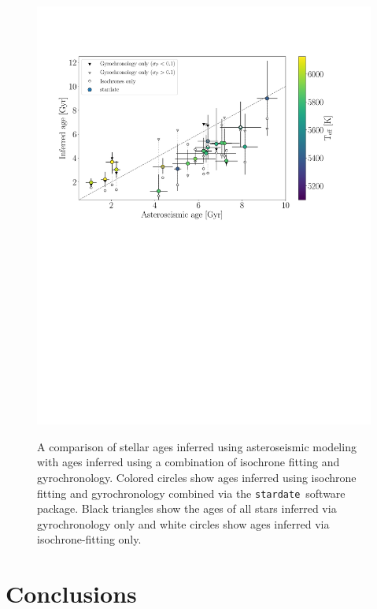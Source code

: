 \documentclass[useAMS, usenatbib, preprint, 12pt]{aastex}
\newcommand{\sd}{{\tt stardate}}
\begin{document}
\begin{figure}
    \caption{ A comparison of stellar ages inferred using
    asteroseismic modeling with ages inferred using a combination of isochrone
    fitting and gyrochronology.
Colored circles show ages inferred using isochrone fitting and gyrochronology
combined via the \sd\ software package.
Black triangles show the ages of all stars inferred via gyrochronology only
    and white circles show ages inferred via isochrone-fitting only.
  }
  \centering
    \includegraphics[width=1.2\textwidth]{asteroseismic_results_nosdss_gaia}
\label{fig:astero}
\end{figure}

\section{Conclusions}
\label{section:conclusion}
\end{document}
